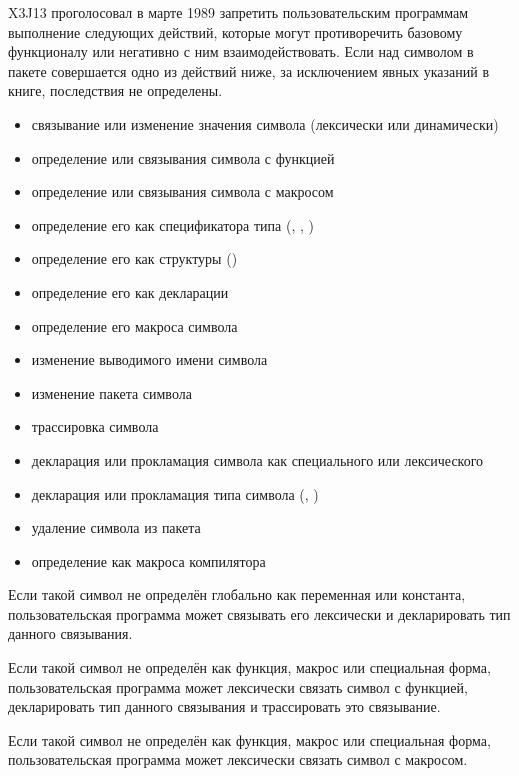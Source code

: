 \begin{newer}
X3J13 проголосовал в марте 1989 
запретить пользовательским программам выполнение следующих действий, которые
могут противоречить базовому функционалу или негативно с ним взаимодействовать.
Если над символом в пакете  совершается одно из действий ниже,
за исключением явных указаний в книге, последствия не определены.
\begin{itemize}
\item связывание или изменение значения символа (лексически или динамически)
\item определение или связывания символа с функцией
\item определение или связывания символа с макросом
\item определение его как спецификатора типа (, , )
\item определение его как структуры ()
\item определение его как декларации
\item определение его макроса символа
\item изменение выводимого имени символа
\item изменение пакета символа
\item трассировка символа
\item декларация или прокламация символа как специального или лексического
\item декларация или прокламация типа символа (, )
\item удаление символа из пакета 
\item определение как макроса компилятора
\end{itemize}

Если такой символ не определён глобально как переменная или константа,
пользовательская программа может связывать его лексически и декларировать тип
 данного связывания.

Если такой символ не определён как функция, макрос или специальная форма,
пользовательская программа может лексически связать символ с функцией,
декларировать тип  данного связывания и трассировать это связывание. 

Если такой символ не определён как функция, макрос или специальная форма,
пользовательская программа может лексически связать символ с макросом.


\end{newer}
